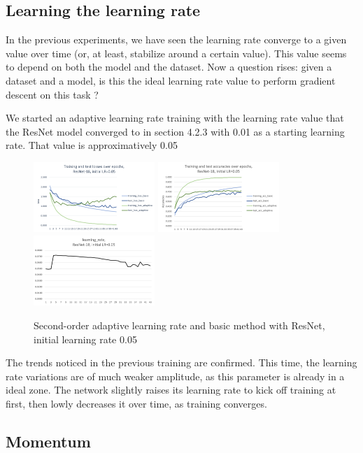 \documentclass{article}
\begin{document}
  \subsection{Learning the learning rate}
  
  In the previous experiments, we have seen the learning rate converge to a given value over time (or, at least, stabilize around a certain value). This value seems to depend on both the model and the dataset. Now a question rises: given a dataset and a model, is this the ideal learning rate value to perform gradient descent on this task ?
  
  We started an adaptive learning rate training with the learning rate value that the ResNet model converged to in section 4.2.3 with 0.01 as a starting learning rate. That value is approximatively 0.05
  
  \begin{figure}[!h]
	\includegraphics[width=130pt]{loss_resnet_0_05.png}
	\includegraphics[width=130pt]{acc_resnet_0_05.png}
	\includegraphics[width=130pt]{lr_resnet_0_05.png}
	\caption{Second-order adaptive learning rate and basic method with ResNet, initial learning rate 0.05}
  \end{figure}
  
  The trends noticed in the previous training are confirmed. This time, the learning rate variations are of much weaker amplitude, as this parameter is already in a ideal zone. The network slightly raises its learning rate to kick off training at first, then lowly decreases it over time, as training converges. 
  
  \subsection{Momentum}
  
\end{document}
